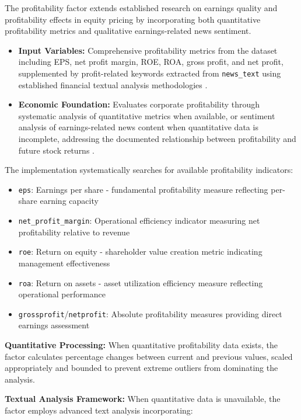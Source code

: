 \documentclass[3p,times,procedia]{elsarticle}
\begin{document}
The profitability factor extends established research on earnings quality and profitability effects in equity pricing \cite{Zhang2006} by incorporating both quantitative profitability metrics and qualitative earnings-related news sentiment.

\begin{itemize}
    \item \textbf{Input Variables:} Comprehensive profitability metrics from the dataset \cite{FinReportDataset2025} including EPS, net profit margin, ROE, ROA, gross profit, and net profit, supplemented by profit-related keywords extracted from \texttt{news\_text} using established financial textual analysis methodologies \cite{Loughran2011}.
    \item \textbf{Economic Foundation:} Evaluates corporate profitability through systematic analysis of quantitative metrics when available, or sentiment analysis of earnings-related news content when quantitative data is incomplete, addressing the documented relationship between profitability and future stock returns \cite{Zhang2006}.
\end{itemize}

The implementation systematically searches for available profitability indicators:

\begin{itemize}
    \item \texttt{eps}: Earnings per share - fundamental profitability measure reflecting per-share earning capacity
    \item \texttt{net\_profit\_margin}: Operational efficiency indicator measuring net profitability relative to revenue
    \item \texttt{roe}: Return on equity - shareholder value creation metric indicating management effectiveness
    \item \texttt{roa}: Return on assets - asset utilization efficiency measure reflecting operational performance
    \item \texttt{grossprofit}/\texttt{netprofit}: Absolute profitability measures providing direct earnings assessment
\end{itemize}

\textbf{Quantitative Processing:} When quantitative profitability data exists, the factor calculates percentage changes between current and previous values, scaled appropriately and bounded to prevent extreme outliers from dominating the analysis.

\textbf{Textual Analysis Framework:} When quantitative data is unavailable, the factor employs advanced text analysis incorporating:
\end{document}
